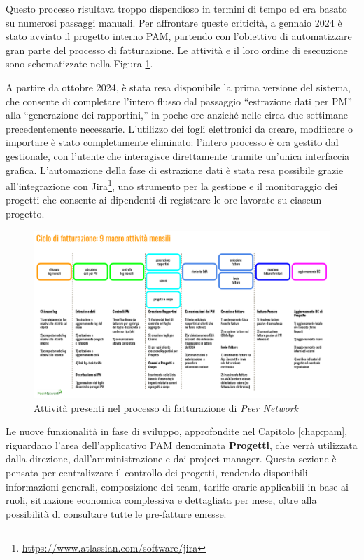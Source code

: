 Questo processo risultava troppo dispendioso in termini di tempo ed era basato su numerosi passaggi manuali. Per affrontare queste criticità, a gennaio 2024
è stato avviato il progetto interno \ac{PAM}, partendo con l’obiettivo di automatizzare gran parte del processo di fatturazione.
Le attività e il loro ordine di esecuzione sono schematizzate nella Figura \ref{fig:fatturazione}.

A partire da ottobre 2024, è stata resa disponibile la prima versione del sistema, che consente di completare l’intero flusso dal passaggio “estrazione dati
per PM” alla “generazione dei rapportini,” in poche ore anziché nelle circa due settimane precedentemente necessarie. L’utilizzo dei fogli elettronici da creare,
modificare o importare è stato completamente eliminato: l’intero processo è ora gestito dal gestionale, con l’utente che interagisce direttamente tramite un’unica
interfaccia grafica. L’automazione della fase di estrazione dati è stata resa possibile grazie all’integrazione con Jira\footnote{\url{https://www.atlassian.com/software/jira}},
uno strumento per la gestione e il monitoraggio dei progetti che consente ai dipendenti di registrare le ore lavorate su ciascun progetto.

\begin{figure}
    \centering
    \includegraphics[width=\linewidth]{figures/fasiFatturazionePN.pdf}
    \caption{Attività presenti nel processo di fatturazione di \textit{Peer Network}}
    \label{fig:fatturazione}
\end{figure}

Le nuove funzionalità in fase di sviluppo, approfondite nel Capitolo \ref{chap:pam}, riguardano l’area dell’applicativo \ac{PAM} denominata \textbf{Progetti}, che verrà
utilizzata dalla direzione, dall’amministrazione e dai project manager. Questa sezione è pensata per centralizzare il controllo dei progetti, rendendo disponibili
informazioni generali, composizione dei team, tariffe orarie applicabili in base ai ruoli, situazione economica complessiva e dettagliata per mese, oltre alla
possibilità di consultare tutte le pre-fatture emesse.

